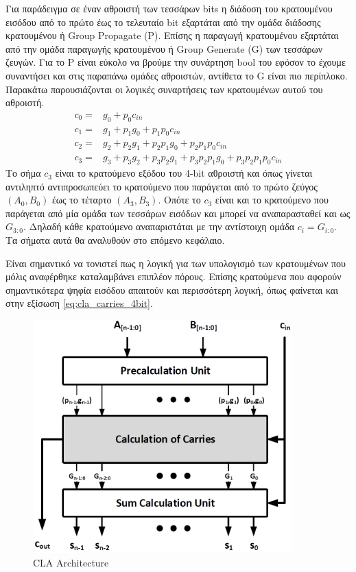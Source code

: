 Για παράδειγμα σε έναν αθροιστή των τεσσάρων bits η διάδοση του κρατουμένου εισόδου από το πρώτο έως το τελευταίο bit εξαρτάται από την ομάδα διάδοσης κρατουμένου ή Group Propagate (P). Επίσης η παραγωγή κρατουμένου εξαρτάται από την ομάδα παραγωγής κρατουμένου ή Group Generate (G) των τεσσάρων ζευγών. Για το P είναι εύκολο να βρούμε την συνάρτηση bool του εφόσον το έχουμε συναντήσει και στις παραπάνω ομάδες αθροιστών, αντίθετα το G είναι πιο περίπλοκο. Παρακάτω παρουσιάζονται οι λογικές συναρτήσεις των κρατουμένων αυτού του αθροιστή.
\begin{equation}
    \begin{split}
        c_0 =& g_0 + p_0c_{in}\\
        c_1 =& g_1 + p_1g_0 + p_1p_0c_{in}\\
        c_2 =& g_2 + p_2g_1 + p_2p_1g_0 + p_2p_1p_0c_{in}\\
        c_3 =& g_3 + p_3g_2 + p_3p_2g_1 + p_3p_2p_1g_0 + p_3p_2p_1p_0c_{in}
    \end{split}
    \label{eq:cla_carries_4bit}
\end{equation}
Το σήμα $c_3$ είναι το κρατούμενο εξόδου του 4-bit αθροιστή και όπως γίνεται αντιληπτό αντιπροσωπεύει το κρατούμενο που παράγεται από το πρώτο ζεύγος $(Α_0,Β_0)$ έως το τέταρτο $(A_3,B_3)$. Οπότε το $c_3$ είναι και το κρατούμενο που παράγεται από μία ομάδα των τεσσάρων εισόδων και μπορεί να αναπαρασταθεί και ως $G_{3:0}$. Δηλαδή κάθε κρατούμενο αναπαριστάται με την αντίστοιχη ομάδα $c_i = G_{i:0}$. Τα σήματα αυτά θα αναλυθούν στο επόμενο κεφάλαιο.

Είναι σημαντικό να τονιστεί πως η λογική για των υπολογισμό των κρατουμένων που μόλις αναφέρθηκε καταλαμβάνει επιπλέον πόρους. Επίσης κρατούμενα που αφορούν σημαντικότερα ψηφία εισόδου απαιτούν και περισσότερη λογική, όπως φαίνεται και στην εξίσωση \ref{eq:cla_carries_4bit}.


\begin{figure}[H]
    \centering
    \includegraphics[height=9cm,width=10cm]{Pictures/CLA_Architecture.png}
    \caption{CLA Architecture}
    \label{cla_architecture}
\end{figure}

